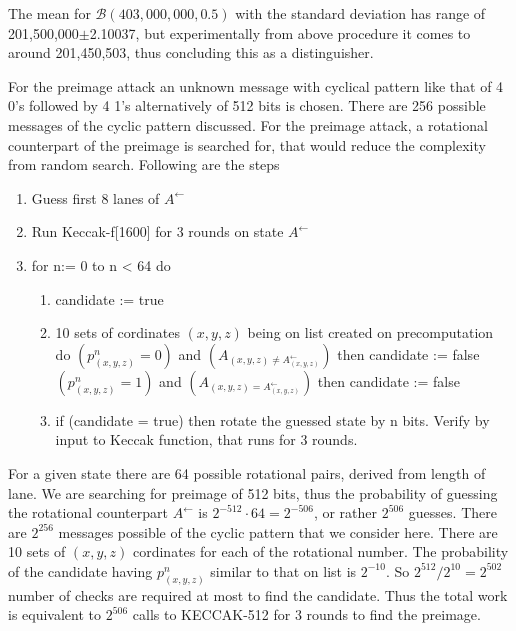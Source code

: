 The mean for $\mathcal{B}(403,000,000, 0.5)$ with the standard deviation has range of 201,500,000$\pm$2.10037, but 
experimentally from above procedure it comes to around 201,450,503, thus concluding this as a distinguisher.

For the preimage attack an unknown message with cyclical pattern like that of 4 0's followed by 4 1's alternatively of
512 bits is chosen. There are 256 possible messages of the cyclic pattern discussed. For the preimage attack, a rotational
counterpart of the preimage is searched for, that would reduce the complexity from random search. Following are the steps
\cite{00022}

\begin{enumerate}
\item Guess first 8 lanes of $A^{\leftarrow}$
\item Run Keccak-f[1600] for 3 rounds on state $A^{\leftarrow}$
\item for n:= 0 to n < 64 do
  \begin{enumerate}
  \item candidate := true
  \item 10 sets of cordinates $(x, y, z)$ being on list created on precomputation do
  \newline $(p^n_{(x, y, z)} = 0)$ and $(A_{(x, y, z) \neq A^{\leftarrow}_{(x, y, z)}})$ then candidate := false
  \newline $(p^n_{(x, y, z)} = 1)$ and $(A_{(x, y, z) = A^{\leftarrow}_{(x, y, z)}})$ then candidate := false
  \item if (candidate = true) then rotate the guessed state by n bits. Verify by input to Keccak function, that
  runs for 3 rounds.
  \end{enumerate}
\end{enumerate}

For a given state there are 64 possible rotational pairs, derived from length of lane. We are searching for preimage
of 512 bits, thus the probability of guessing the rotational counterpart $A^{\leftarrow}$ is $2^{-512} \cdot 64 = 2^{-506}$,
or rather $2^{506}$ guesses. There are $2^{256}$ messages possible of the cyclic pattern that we consider here. There
are 10 sets of $(x, y, z)$ cordinates for each of the rotational number. The probability of the candidate having 
$p^n_{(x, y, z)}$ similar to that on list is $2^{-10}$. So $2^{512} / 2^{10} = 2^{502}$ number of checks are required
at most to find the candidate. Thus the total work is equivalent to $2^{506}$ calls to KECCAK-512 for 3 rounds to find
the preimage.

